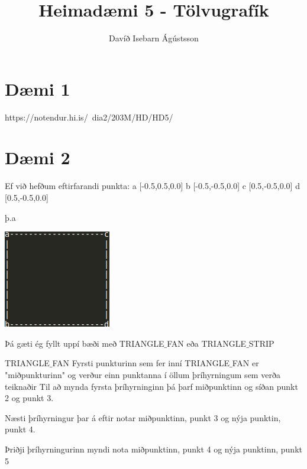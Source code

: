 \documentclass[11pt,twocolumn]{article}
\title{ Heimadæmi 5 - Tölvugrafík }
\date{}
\author{Davíð Isebarn Ágústsson }
\begin{document}
\maketitle

\section*{Dæmi 1}

https://notendur.hi.is/~dia2/203M/HD/HD5/

\section*{Dæmi 2}
Ef við hefðum eftirfarandi punkta:
a [-0.5,0.5,0.0] 
b [-0.5,-0.5,0.0]
c [0.5,-0.5,0.0]
d [0.5,-0.5,0.0]

þ.a 

\includegraphics[width = \linewidth]{9.png}

Þá gæti ég fyllt uppí bæði með TRIANGLE$\_$FAN eða TRIANGLE$\_$STRIP

TRIANGLE$\_$FAN 
Fyrsti punkturinn sem fer inní TRIANGLE$\_$FAN er "miðpunkturinn" 
og verður einn punktanna í öllum þríhyrningum sem verða teiknaðir
Til að mynda fyrsta þríhyrninginn þá þarf miðpunktinn og síðan punkt
2 og punkt 3. 

Næsti þríhyrningur þar á eftir notar miðpunktinn,
punkt 3 og nýja punktin, punkt 4. 

Þriðji þríhyrningurinn myndi nota miðpunktinn,
punkt 4 og nýja punktinn, punkt 5
\end{document}
